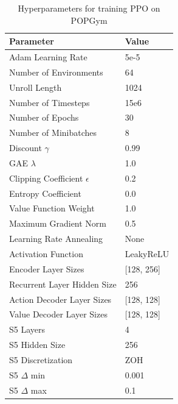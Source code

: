 \documentclass{article}
\begin{document}
\begin{table}[h]
\centering
\caption{Hyperparameters for training PPO on POPGym}
\label{tab:popgym-params}
\begin{tabular}{l|l}
Parameter & Value \\ \hline
Adam Learning Rate & 5e-5 \\
Number of Environments & 64 \\
Unroll Length & 1024 \\
Number of Timesteps & 15e6 \\
Number of Epochs & 30 \\
Number of Minibatches & 8 \\
Discount $\gamma$ & 0.99 \\
GAE $\lambda$ & 1.0 \\
Clipping Coefficient $\epsilon$ & 0.2 \\
Entropy Coefficient & 0.0 \\
Value Function Weight & 1.0 \\
Maximum Gradient Norm & 0.5 \\
Learning Rate Annealing & None \\
Activation Function & LeakyReLU \\
Encoder Layer Sizes & [128, 256] \\
Recurrent Layer Hidden Size & 256 \\
Action Decoder Layer Sizes & [128, 128] \\
Value Decoder Layer Sizes & [128, 128] \\
S5 Layers & 4 \\
S5 Hidden Size & 256 \\
S5 Discretization & ZOH \\
S5 $\Delta$ min & 0.001 \\
S5 $\Delta$ max & 0.1 \\
\end{tabular}
\end{table}

\newpage
\end{document}
